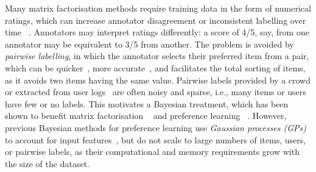 Many matrix factorisation methods %
require training data in the form of numerical ratings, 
which can increase annotator disagreement or inconsistent labelling over time
~\citep{ovadia2004ratings,yannakakis2011ranking}. Annotators may interpret ratings
differently: a score of 4/5, say, from one annotator may be equivalent to 3/5 from another. 
The problem is avoided by \emph{pairwise labelling}, 
in which the annotator selects their preferred item from a pair,
which can be quicker~\citep{kendall1948rank,kingsley2010preference,yang2011ranking},
more accurate~\citep{kiritchenko2017best},
and facilitates the total sorting of items, as it avoids two items having the same value.
Pairwise labels provided by a crowd
or extracted from user logs~\citep{joachims2002optimizing} are often noisy and sparse, i.e., many items or users have few or no labels.
This motivates
a Bayesian treatment, %
which has been shown to benefit matrix factorisation
~\citep{salakhutdinov2008bayesian}
and preference learning%
~\citep{chen2013pairwise}.
However, previous Bayesian methods for preference learning use
\emph{Gaussian processes (GPs)} to account for input
features~\citep{chu2005preference,houlsby2012collaborative,khan2014scalable},
but do not scale to large numbers of items, users, or
pairwise labels, 
as their computational and memory requirements grow with the size of the dataset.

